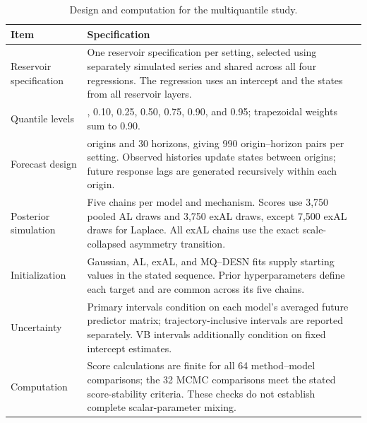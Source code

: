 \begin{table}[!htbp]
\centering
\small
\setlength{\tabcolsep}{3pt}
\renewcommand{\arraystretch}{1.08}
\begin{tabular}{@{}>{\raggedright\arraybackslash}p{}>{\raggedright\arraybackslash}p{}@{}}
\toprule
Item & Specification \\
\midrule
Reservoir specification & One reservoir specification per setting, selected using separately simulated series and shared across all four regressions. The regression uses an intercept and the states from all reservoir layers. \\
Quantile levels & 0.05, 0.10, 0.25, 0.50, 0.75, 0.90, and 0.95; trapezoidal weights sum to 0.90. \\
Forecast design & 33 origins and 30 horizons, giving 990 origin--horizon pairs per setting. Observed histories update states between origins; future response lags are generated recursively within each origin. \\
Posterior simulation & Five chains per model and mechanism. Scores use 3,750 pooled AL draws and 3,750 exAL draws, except 7,500 exAL draws for Laplace. All exAL chains use the exact scale-collapsed asymmetry transition. \\
Initialization & Gaussian, AL, exAL, and MQ--DESN fits supply starting values in the stated sequence. Prior hyperparameters define each target and are common across its five chains. \\
Uncertainty & Primary intervals condition on each model's averaged future predictor matrix; trajectory-inclusive intervals are reported separately. VB intervals additionally condition on fixed intercept estimates. \\
Computation & Score calculations are finite for all 64 method--model comparisons; the 32 MCMC comparisons meet the stated score-stability criteria. These checks do not establish complete scalar-parameter mixing. \\
\bottomrule
\end{tabular}
\caption{Design and computation for the multiquantile study.}
\label{tab:joint-qdesn-pure-desn-v2-protocol}
\end{table}

